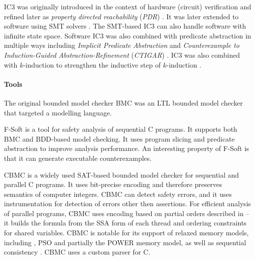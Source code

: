 IC3 was originally introduced in the context of hardware (circuit) verification  and refined later as \emph{property directed reachability} (\emph{PDR}) .
It was later extended to software using SMT solvers .
The SMT-based IC3 can also handle software with infinite state space.
Software IC3 was also combined with predicate abstraction in multiple ways including \emph{Implicit Predicate Abstraction}  and \emph{Counterexample to Induction-Guided Abstraction-Refinement} (\emph{CTIGAR}) .
IC3 was also combined with $k$-induction to strengthen the inductive step of $k$-induction .

\paragraph{Tools}

The original bounded model checker BMC  was an LTL bounded
model checker that targeted a modelling language.

F-Soft  is a tool for safety analysis of sequential C programs.
It supports both BMC and BDD-based model checking.
It uses program slicing and predicate abstraction to improve analysis performance.
An interesting property of F-Soft is that it can generate executable counterexamples.

CBMC  is a widely used SAT-based bounded
model checker for sequential and parallel C programs.
It uses bit-precise encoding and therefore preserves semantics of computer
integers.
CBMC can detect safety errors, and it uses instrumentation for detection of
errors other then assertions.
For efficient analysis of parallel programs, CBMC uses encoding based on
partial orders described in  -- it builds the formula from
the SSA form of each thread and ordering constraints for shared variables.
CBMC is notable for its support of relaxed memory models, including \xtso,
PSO and partially the POWER memory model, as well as sequential consistency
.
CBMC uses a custom parser for C.

